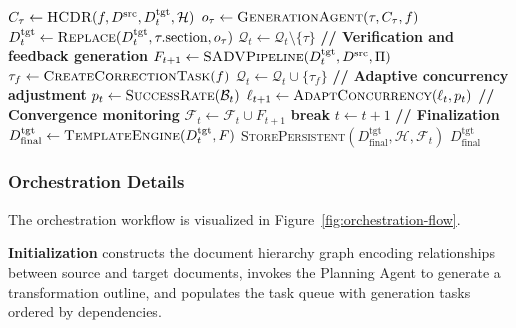 \documentclass{ieeeaccess}
\begin{document}
\begin{algorithm}[!t]
\begin{algorithmic}[1]
            \State \(C_\tau \gets \textsc{HCDR}(f, D^{\text{src}}, D^{\text{tgt}}_t, \mathcal{H})\) 
            \State \(o_\tau \gets \textsc{GenerationAgent}(\tau, C_\tau, f)\) 
            \State \(D^{\text{tgt}}_t \gets \textsc{Replace}(D^{\text{tgt}}_t, \tau.\text{section}, o_\tau)\) 
        \EndIf
        \State \(\mathcal{Q}_t \gets \mathcal{Q}_t \setminus \{\tau\}\) 
    \EndFor
    \State
    \State \textbf{// Verification and feedback generation}
    \State \(F_{t+1} \gets \textsc{SADVPipeline}(D^{\text{tgt}}_t, D^{\text{src}}, \Pi)\) 
            \State \(\tau_f \gets \textsc{CreateCorrectionTask}(f)\) 
            \State \(\mathcal{Q}_t \gets \mathcal{Q}_t \cup \{\tau_f\}\) 
        \EndFor
    \EndIf
    \State
    \State \textbf{// Adaptive concurrency adjustment}
    \State \(p_t \gets \textsc{SuccessRate}(\mathcal{B}_t)\) 
    \State \(\ell_{t+1} \gets \textsc{AdaptConcurrency}(\ell_t, p_t)\) 
    \State
    \State \textbf{// Convergence monitoring}
    \State \(\mathcal{F}_t \gets \mathcal{F}_t \cup F_{t+1}\)
        \State \textbf{break} 
    \EndIf
    \State \(t \gets t + 1\)
\EndWhile
\State
\State \textbf{// Finalization}
\State \(D^{\text{tgt}}_{\text{final}} \gets \textsc{TemplateEngine}(D^{\text{tgt}}_t, F)\) 
\State \textsc{StorePersistent}\((D^{\text{tgt}}_{\text{final}}, \mathcal{H}, \mathcal{F}_t)\) 
\State \Return \(D^{\text{tgt}}_{\text{final}}\)
\end{algorithmic}
\normalsize
\end{algorithm}

\subsubsection{Orchestration Details}

The orchestration workflow is visualized in Figure~\ref{fig:orchestration-flow}.

\textbf{Initialization} constructs the document hierarchy graph encoding relationships between source and target documents, invokes the Planning Agent to generate a transformation outline, and populates the task queue with generation tasks ordered by dependencies.
\end{document}
